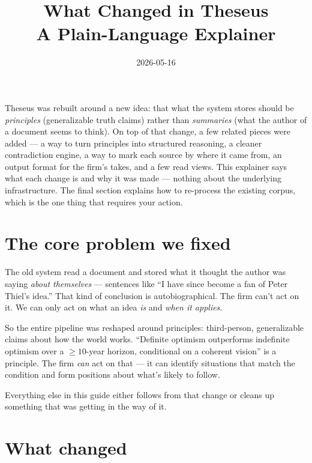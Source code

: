 \documentclass[11pt]{article}
\title{\sffamily\textbf{What Changed in Theseus} \\[0.4em]
       \large\sffamily A Plain-Language Explainer}
\author{}
\date{2026-05-16}
\begin{document}
\maketitle
\thispagestyle{empty}

\begin{tldr}
Theseus was rebuilt around a new idea: that what the system stores
should be \emph{principles} (generalizable truth claims) rather than
\emph{summaries} (what the author of a document seems to think). On
top of that change, a few related pieces were added — a way to
turn principles into structured reasoning, a cleaner contradiction
engine, a way to mark each source by where it came from, an
output format for the firm's takes, and a few read views. This
explainer says what each change is and why it was made — nothing
about the underlying infrastructure. The final section explains
how to re-process the existing corpus, which is the one thing
that requires your action.
\end{tldr}

\tableofcontents
\newpage

\section{The core problem we fixed}

The old system read a document and stored what it thought the
author was saying \emph{about themselves} — sentences like ``I
have since become a fan of Peter Thiel's idea.'' That kind of
conclusion is autobiographical. The firm can't act on it. We can
only act on what an idea \emph{is} and \emph{when it applies}.

So the entire pipeline was reshaped around principles: third-person,
generalizable claims about how the world works. ``Definite optimism
outperforms indefinite optimism over a $\geq 10$-year horizon,
conditional on a coherent vision'' is a principle. The firm
\emph{can} act on that — it can identify situations that match the
condition and form positions about what's likely to follow.

Everything else in this guide either follows from that change or
cleans up something that was getting in the way of it.

\section{What changed}
\end{document}
